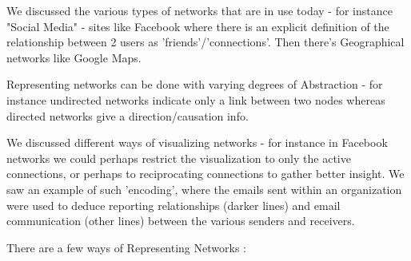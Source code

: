 We discussed the various types of networks that are in use today - for instance "Social Media" - sites like Facebook where there is an explicit definition of the relationship between 2 users as 'friends'/'connections'.
Then there's Geographical networks like Google Maps.

Representing networks can be done with varying degrees of Abstraction - for instance undirected networks indicate only a link between two nodes whereas directed networks give a direction/causation info.

We discussed different ways of visualizing networks - for instance in Facebook networks we could perhaps restrict the visualization to only the active connections, or perhaps to reciprocating connections to gather better insight.
We saw an example of such 'encoding', where the emails sent within an organization were used to deduce reporting relationships (darker lines) and email communication (other lines) between the various senders and receivers.

There are a few ways of Representing Networks :

